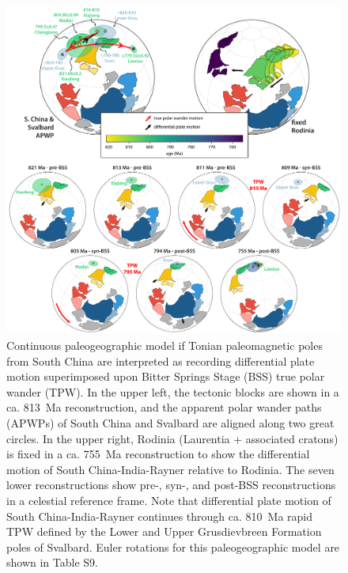\begin{figure}[!htbp]
    \centering
    \includegraphics[width=\textwidth]{figures/Xiajiang/BSS-APWP.pdf}
    \caption[Continuous paleogeographic model if Tonian paleomagnetic poles from South China are interpreted as recording differential plate motion superimposed upon Bitter Springs Stage true polar wander.]{Continuous paleogeographic model if Tonian paleomagnetic poles from South China are interpreted as recording differential plate motion superimposed upon Bitter Springs Stage (BSS) true polar wander (TPW). In the upper left, the tectonic blocks are shown in a ca. 813~Ma reconstruction, and the apparent polar wander paths (APWPs) of South China and Svalbard are aligned along two great circles. In the upper right, Rodinia (Laurentia + associated cratons) is fixed in a ca. 755~Ma reconstruction to show the differential motion of South China-India-Rayner relative to Rodinia. The seven lower reconstructions show pre-, syn-, and post-BSS reconstructions in a celestial reference frame. Note that differential plate motion of South China-India-Rayner continues through ca. 810~Ma rapid TPW defined by the Lower and Upper Grusdievbreen Formation poles of Svalbard. Euler rotations for this paleogeographic model are shown in Table S9.}
    \label{fig:BSS-APWP}
\end{figure}

